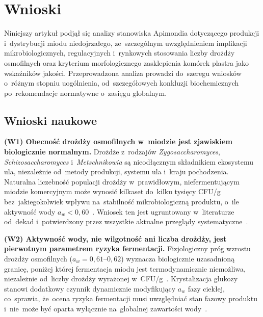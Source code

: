
\section{Wnioski}

Niniejszy artykuł podjął się analizy stanowiska
Apimondia dotyczącego produkcji i~dystrybucji miodu
niedojrzałego, ze~szczególnym uwzględnieniem implikacji
mikrobiologicznych, regulacyjnych i~rynkowych stosowania
liczby drożdży osmofilnych oraz kryterium morfologicznego
zasklepienia komórek plastra jako wskaźników jakości.
Przeprowadzona analiza prowadzi do~szeregu wniosków
o~różnym stopniu uogólnienia, od~szczegółowych
konkluzji biochemicznych po~rekomendacje normatywne
o~zasięgu globalnym.

\subsection{Wnioski naukowe}

\textbf{(W1) Obecność drożdży osmofilnych w~miodzie jest zjawiskiem biologicznie normalnym.}
Drożdże z~rodzajów \textit{Zygosaccharomyces}, \textit{Schizosaccharomyces}
i~\textit{Metschnikowia} są nieodłącznym składnikiem ekosystemu
ula, niezależnie od~metody produkcji, systemu ula i~kraju
pochodzenia. Naturalna liczebność populacji drożdży
w~prawidłowym, niefermentującym miodzie komercyjnym
może wynosić kilkaset do~kilku tysięcy CFU/g bez~jakiegokolwiek
wpływu na~stabilność mikrobiologiczną produktu, o~ile
aktywność wody $a_w < 0{,}60$~\cite{ruegg1981}.
Wniosek ten jest ugruntowany w~literaturze od~dekad
i~potwierdzony przez wszystkie aktualne przeglądy
systematyczne~\cite{biochemreactions2022,rodriguezmachado2024}.

\textbf{(W2) Aktywność wody, nie wilgotność ani liczba drożdży, jest pierwotnym parametrem ryzyka fermentacji.}
Fizjologiczny próg wzrostu drożdży osmofilnych
($a_w = 0{,}61$--$0{,}62$) wyznacza biologicznie
uzasadnioną granicę, poniżej której fermentacja miodu
jest termodynamicznie niemożliwa, niezależnie od~liczby
drożdży wyrażonej w~CFU/g~\cite{waaw2006,ruegg1981}.
Krystalizacja glukozy stanowi dodatkowy czynnik dynamicznie
modyfikujący $a_w$ fazy ciekłej, co~sprawia, że~ocena
ryzyka fermentacji musi uwzględniać stan fazowy produktu
i~nie~może być oparta wyłącznie na~globalnej zawartości
wody~\cite{zamora2006,ijfans2019}.

